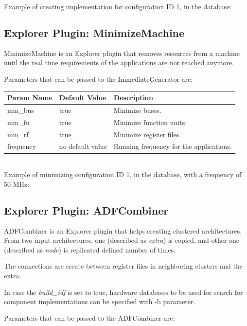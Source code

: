 \documentclass[a4paper,twoside]{tceusermanual}
\begin{document}
Example of creating implementation for configuration ID 1, in the database:


\subsection{Explorer Plugin: MinimizeMachine}
MinimizeMachine is an Explorer plugin that removes resources from a machine
until the real time requirements of the applications are not reached anymore.

Parameters that can be passed to the ImmediateGenerator are:

\begin{tabular}{p{}p{}
                p{}}
\textbf{Param Name} &\textbf{Default Value} &\textbf{Description} \\
\hline
min\_bus & true & Minimize buses. \\
min\_fu & true & Minimize function units. \\
min\_rf & true & Minimize register files. \\
frequency & no default value & Running frequency for the applications. \\
\end{tabular}\\

Example of minimizing configuration ID 1, in the database, with a frequency
of 50 MHz:


\subsection{Explorer Plugin: ADFCombiner}
ADFCombiner is an Explorer plugin that helps creating clustered architectures.
From two input architectures, one (described as \textit{extra}) is copied,
 and other one (described as \textit{node}) is replicated defined
number of times.

The connections are create between register files in neighboring clusters
and the extra.

In case the \textit{build\_idf} is set to true, hardware databases to be used
for search for component implementations can be specified with -b parameter.

Parameters that can be passed to the ADFCombiner are:
\end{document}
